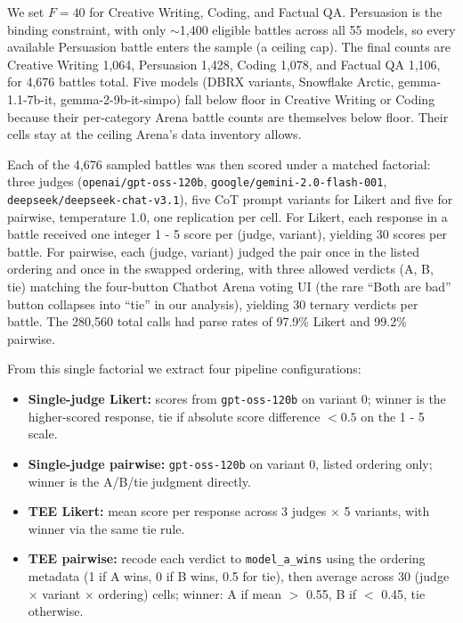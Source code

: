 We set $F = 40$ for Creative Writing, Coding, and Factual QA. Persuasion is the binding constraint, with only $\sim$1,400 eligible battles across all 55 models, so every available Persuasion battle enters the sample (a ceiling cap). The final counts are Creative Writing 1,064, Persuasion 1,428, Coding 1,078, and Factual QA 1,106, for 4,676 battles total. Five models (DBRX variants, Snowflake Arctic, gemma-1.1-7b-it, gemma-2-9b-it-simpo) fall below floor in Creative Writing or Coding because their per-category Arena battle counts are themselves below floor. Their cells stay at the ceiling Arena's data inventory allows.

Each of the 4,676 sampled battles was then scored under a matched factorial: three judges (\texttt{openai/gpt-oss-120b}, \texttt{google/gemini-2.0-flash-001}, \texttt{deepseek/deepseek-chat-v3.1}), five CoT prompt variants for Likert and five for pairwise, temperature 1.0, one replication per cell. For Likert, each response in a battle received one integer 1 - 5 score per (judge, variant), yielding 30 scores per battle. For pairwise, each (judge, variant) judged the pair once in the listed ordering and once in the swapped ordering, with three allowed verdicts (A, B, tie) matching the four-button Chatbot Arena voting UI (the rare ``Both are bad'' button collapses into ``tie'' in our analysis), yielding 30 ternary verdicts per battle. The 280,560 total calls had parse rates of 97.9\% Likert and 99.2\% pairwise.

From this single factorial we extract four pipeline configurations:
\begin{itemize}\setlength{\itemsep}{2pt}
\item \textbf{Single-judge Likert:} scores from \texttt{gpt-oss-120b} on variant 0; winner is the higher-scored response, tie if absolute score difference $< 0.5$ on the 1 - 5 scale.
\item \textbf{Single-judge pairwise:} \texttt{gpt-oss-120b} on variant 0, listed ordering only; winner is the A/B/tie judgment directly.
\item \textbf{TEE Likert:} mean score per response across 3 judges $\times$ 5 variants, with winner via the same tie rule.
\item \textbf{TEE pairwise:} recode each verdict to \texttt{model\_a\_wins} using the ordering metadata (1 if A wins, 0 if B wins, 0.5 for tie), then average across 30 (judge $\times$ variant $\times$ ordering) cells; winner: A if mean $>$ 0.55, B if $<$ 0.45, tie otherwise.
\end{itemize}

